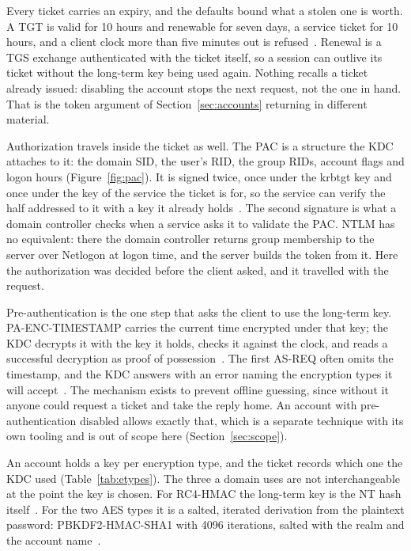 Every ticket carries an expiry, and the defaults bound what a stolen one is worth. A TGT is valid for
10 hours and renewable for seven days, a service ticket for 10 hours, and a
client clock more than five minutes out is refused~\cite{ms-gpsb}. Renewal is a TGS exchange
authenticated with the ticket itself, so a session can outlive its ticket without the long-term key
being used again. Nothing recalls a ticket already issued: disabling the account stops the next
request, not the one in hand. That is the token argument of Section~\ref{sec:accounts} returning in
different material.

Authorization travels inside the ticket as well. The PAC is a structure the KDC attaches to it: the
domain SID, the user's RID, the group RIDs, account flags and logon hours
(Figure~\ref{fig:pac}). It is signed twice, once under the krbtgt key and once under the key of the
service the ticket is for, so the service can verify the half addressed to it with a key it already
holds~\cite{ms-pac}. The second signature is what a domain controller checks when a service asks it to
validate the PAC. NTLM has no equivalent: there the domain controller returns group membership to
the server over Netlogon at logon time, and the server builds the token from it. Here the
authorization was decided before the client asked, and it travelled with the request.



Pre-authentication is the one step that asks the client to use the long-term key.
PA-ENC-TIMESTAMP carries the current time encrypted under that key; the KDC decrypts it with the key
it holds, checks it against the clock, and reads a successful decryption as proof of
possession~\cite{rfc4120}. The first AS-REQ often omits the timestamp, and the KDC answers with an
error naming the encryption types it will accept~\cite{ms-kdc-rc4}. The mechanism exists to prevent
offline guessing, since without it anyone could request a ticket and take the reply home. An account
with pre-authentication disabled allows exactly that, which is a separate technique with its own
tooling and is out of scope here (Section~\ref{sec:scope}).

An account holds a key per encryption type, and the ticket records which one the KDC used
(Table~\ref{tab:etypes}). The three a domain uses are not interchangeable at the point the key is
chosen. For RC4-HMAC the long-term key is the NT hash itself~\cite{rfc4757}. For the two AES types it
is a salted, iterated derivation from the plaintext password: PBKDF2-HMAC-SHA1 with 4096
iterations, salted with the realm and the account name~\cite{rfc3962}.

